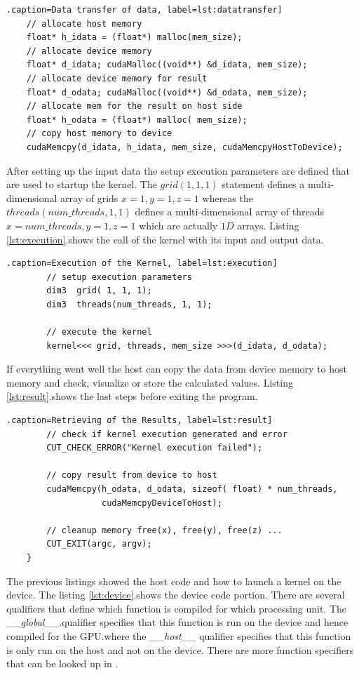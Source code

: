 \begin{lstlisting}.caption=Data transfer of data, label=lst:datatransfer]
	// allocate host memory 
	float* h_idata = (float*) malloc(mem_size);
	// allocate device memory 
	float* d_idata; cudaMalloc((void**) &d_idata, mem_size);
	// allocate device memory for result
	float* d_odata; cudaMalloc((void**) &d_odata, mem_size);
	// allocate mem for the result on host side
	float* h_odata = (float*) malloc( mem_size);
	// copy host memory to device 
	cudaMemcpy(d_idata, h_idata, mem_size, cudaMemcpyHostToDevice);
\end{lstlisting} 


After setting up the input data the setup execution parameters are defined that
are used to startup the kernel. The $grid(1, 1, 1)$ statement defines a
multi-dimensional array of grids $x=1, y=1, z=1$ whereas the
$threads(num\_threads, 1, 1)$ defines a multi-dimensional array of threads
$x=num\_threads, y=1, z=1$ which are actually $1D$ arrays. Listing
\autoref{lst:execution}.shows the call of the kernel with its input and output data.


\begin{lstlisting}.caption=Execution of the Kernel, label=lst:execution]
	    // setup execution parameters
	    dim3  grid( 1, 1, 1);
	    dim3  threads(num_threads, 1, 1);

	    // execute the kernel
	    kernel<<< grid, threads, mem_size >>>(d_idata, d_odata);

\end{lstlisting} 



If everything went well the host can copy the data from device memory
to host memory and check, visualize or store the calculated values. Listing
\autoref{lst:result}.shows the last steps before exiting the program.


\begin{lstlisting}.caption=Retrieving of the Results, label=lst:result]
	    // check if kernel execution generated and error
	    CUT_CHECK_ERROR("Kernel execution failed");
 
	    // copy result from device to host
	    cudaMemcpy(h_odata, d_odata, sizeof( float) * num_threads, 
			       cudaMemcpyDeviceToHost);

	    // cleanup memory free(x), free(y), free(z) ...
		CUT_EXIT(argc, argv);
	} 
\end{lstlisting} 



The previous listings showed the host code and how to launch a kernel on the
device. The listing \autoref{lst:device}.shows the device code portion. There are
several qualifiers that define which function is compiled for which processing
unit. The \textit{\_\_global\_\_}.qualifier specifies that this function is run
on the device and hence compiled for the  \gls{GPU}.where the \textit{\_\_host\_\_} 
qualifier specifies that this function is only run on the host and not on the
device. There are more function specifiers that can be looked up in
\citep{citeulike:3325943}.

